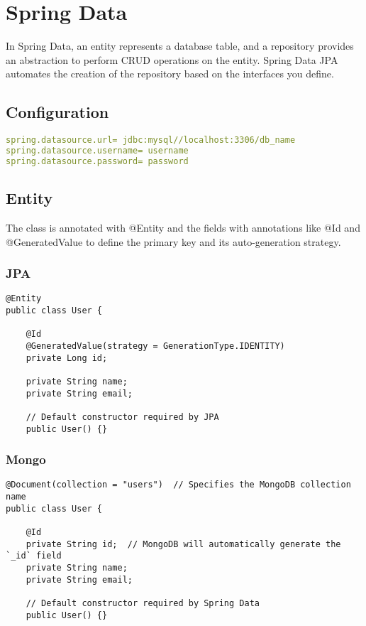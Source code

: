 \documentclass[a4paper, 12pt]{article}
\begin{document}
    \newpage


    \section{Spring Data}

    In Spring Data, an entity represents a database table, and a repository provides an abstraction to perform CRUD operations on the entity. Spring Data JPA automates the creation of the repository based on the interfaces you define.

    \subsection{Configuration}
    \begin{lstlisting}[language=yaml]
spring.datasource.url= jdbc:mysql//localhost:3306/db_name
spring.datasource.username= username
spring.datasource.password= password
    \end{lstlisting}

    \subsection{Entity}
    The class is annotated with @Entity and the fields with annotations like @Id and @GeneratedValue to define the primary key and its auto-generation strategy.

    \subsubsection{JPA}
    \begin{lstlisting}
@Entity
public class User {

    @Id
    @GeneratedValue(strategy = GenerationType.IDENTITY)
    private Long id;

    private String name;
    private String email;

    // Default constructor required by JPA
    public User() {}
    \end{lstlisting}

    \subsubsection{Mongo}
    \begin{lstlisting}
@Document(collection = "users")  // Specifies the MongoDB collection name
public class User {

    @Id
    private String id;  // MongoDB will automatically generate the `_id` field
    private String name;
    private String email;

    // Default constructor required by Spring Data
    public User() {}
    \end{lstlisting}
\end{document}
